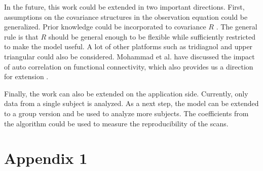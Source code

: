 \documentclass[fleqn]{article}
\begin{document}
In the future, this work could be extended in two important directions. First, assumptions on the covariance structures in the observation equation could be generalized. Prior knowledge could be incorporated to covariance $R$ \cite{allen2014generalized}. The general rule is that $R$ should be general enough to be flexible while sufficiently restricted to make the model useful. A lot of other platforms such as tridiagnol and upper triangular could also be considered. Mohammad et al. have discussed the impact of auto correlation on functional connectivity, which also provides us a direction for extension \cite{arbabshirani2014impact}.

Finally, the work can also be extended on the application side. Currently, only data from a single subject is analyzed. As a next step, the model can be extended to a group version and be used to analyze more subjects. The coefficients from the algorithm could be used to measure the reproducibility of the scans.

\section*{Appendix 1}
\label{sec:appendix1}
\end{document}
